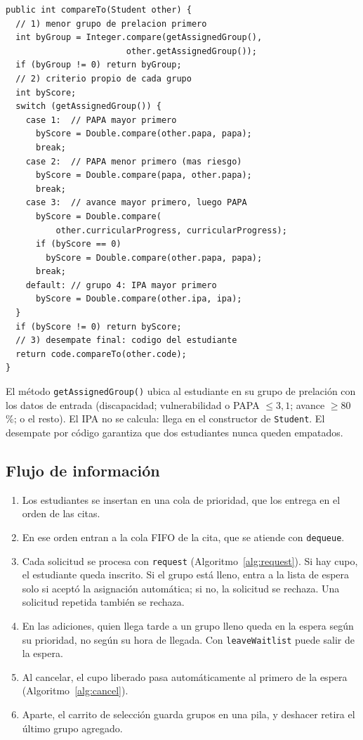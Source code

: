 \documentclass[conference]{IEEEtran}
\begin{document}
\begin{lstlisting}
public int compareTo(Student other) {
  // 1) menor grupo de prelacion primero
  int byGroup = Integer.compare(getAssignedGroup(),
                        other.getAssignedGroup());
  if (byGroup != 0) return byGroup;
  // 2) criterio propio de cada grupo
  int byScore;
  switch (getAssignedGroup()) {
    case 1:  // PAPA mayor primero
      byScore = Double.compare(other.papa, papa);
      break;
    case 2:  // PAPA menor primero (mas riesgo)
      byScore = Double.compare(papa, other.papa);
      break;
    case 3:  // avance mayor primero, luego PAPA
      byScore = Double.compare(
          other.curricularProgress, curricularProgress);
      if (byScore == 0)
        byScore = Double.compare(other.papa, papa);
      break;
    default: // grupo 4: IPA mayor primero
      byScore = Double.compare(other.ipa, ipa);
  }
  if (byScore != 0) return byScore;
  // 3) desempate final: codigo del estudiante
  return code.compareTo(other.code);
}
\end{lstlisting}

El método \texttt{getAssignedGroup()} ubica al estudiante en su grupo de prelación con los datos de entrada (discapacidad; vulnerabilidad o PAPA $\leq 3{,}1$; avance $\geq 80$\,\%; o el resto). El IPA no se calcula: llega en el constructor de \texttt{Student}. El desempate por código garantiza que dos estudiantes nunca queden empatados.

\subsection{Flujo de información}
\begin{enumerate}
    \item Los estudiantes se insertan en una cola de prioridad, que los entrega en el orden de las citas.
    \item En ese orden entran a la cola FIFO de la cita, que se atiende con \texttt{dequeue}.
    \item Cada solicitud se procesa con \texttt{request} (Algoritmo~\ref{alg:request}). Si hay cupo, el estudiante queda inscrito. Si el grupo está lleno, entra a la lista de espera solo si aceptó la asignación automática; si no, la solicitud se rechaza. Una solicitud repetida también se rechaza.
    \item En las adiciones, quien llega tarde a un grupo lleno queda en la espera según su prioridad, no según su hora de llegada. Con \texttt{leaveWaitlist} puede salir de la espera.
    \item Al cancelar, el cupo liberado pasa automáticamente al primero de la espera (Algoritmo~\ref{alg:cancel}).
    \item Aparte, el carrito de selección guarda grupos en una pila, y deshacer retira el último grupo agregado.
\end{enumerate}
\end{document}

